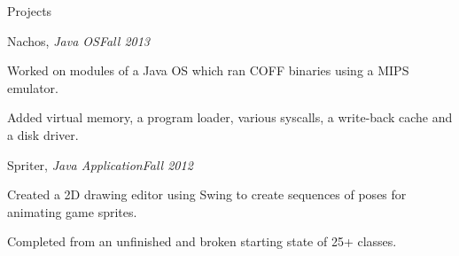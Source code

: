 \documentclass{resume} %
\begin{document}
\begin{rSection}{Projects}
\begin{rSubsection}{Nachos, {\em Java OS}}{{\em Fall 2013}}{}{}
\item Worked on modules of a Java OS which ran COFF binaries using a MIPS emulator.
\item Added virtual memory, a program loader, various syscalls, a write-back cache and a disk driver.
\end{rSubsection}

\begin{rSubsection}{Spriter, {\em Java Application}}{{\em Fall 2012}}{}{}
\item Created a 2D drawing editor using Swing to create sequences of poses for animating game sprites.
\item Completed from an unfinished and broken starting state of 25+ classes.
\end{rSubsection}

\end{rSection}



\end{document}
